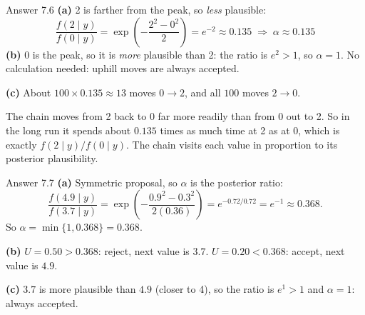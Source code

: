 \documentclass[aspectratio=43,11pt]{beamer}
\begin{document}
\begin{frame}{Answer 7.6}
  \textbf{(a)} 2 is farther from the peak, so \emph{less} plausible:
  \[
    \frac{f(2 \mid y)}{f(0 \mid y)}
    = \exp\!\left(-\frac{2^2 - 0^2}{2}\right) = e^{-2} \approx 0.135
    \;\Rightarrow\; \alpha \approx 0.135
  \]
  \textbf{(b)} 0 is the peak, so it is \emph{more} plausible than 2:
  the ratio is $e^{2} > 1$, so $\alpha = 1$. No calculation needed:
  uphill moves are always accepted.
  \vspace{0.4em}

  \textbf{(c)} About $100 \times 0.135 \approx 13$ moves $0 \to 2$, and
  all $100$ moves $2 \to 0$.
  \vspace{0.2em}

  The chain moves from 2 back to 0 far more readily than from 0 out to 2.
  So in the long run it spends about $0.135$ times as much time at 2 as
  at 0, which is exactly $f(2 \mid y)/f(0 \mid y)$. The chain visits each
  value in proportion to its posterior plausibility.
\end{frame}

\begin{frame}{Answer 7.7}
  \textbf{(a)} Symmetric proposal, so $\alpha$ is the posterior ratio:
  \[
    \frac{f(4.9 \mid y)}{f(3.7 \mid y)}
    = \exp\!\left(-\frac{0.9^2 - 0.3^2}{2(0.36)}\right)
    = e^{-0.72/0.72} = e^{-1} \approx 0.368 .
  \]
  So $\alpha = \min\{1, 0.368\} = 0.368$.
  \vspace{0.4em}

  \textbf{(b)} $U = 0.50 > 0.368$: reject, next value is $3.7$.
  $U = 0.20 < 0.368$: accept, next value is $4.9$.
  \vspace{0.4em}

  \textbf{(c)} $3.7$ is more plausible than $4.9$ (closer to 4), so the
  ratio is $e^{1} > 1$ and $\alpha = 1$: always accepted.
\end{frame}

%
%
\end{document}
